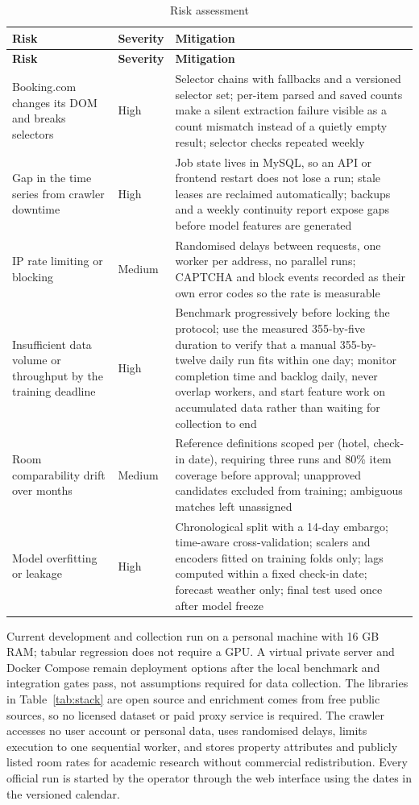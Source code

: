 \begin{longtable}{|p{3.5cm}|p{1.5cm}|p{8.2cm}|}
\caption{Risk assessment}
\label{tab:risks} \\
\hline
\textbf{Risk} & \textbf{Severity} & \textbf{Mitigation} \\
\hline
\endfirsthead
\hline
\textbf{Risk} & \textbf{Severity} & \textbf{Mitigation} \\
\hline
\endhead
\hline
\endfoot
\hline
\endlastfoot
Booking.com changes its DOM and breaks selectors & High & Selector chains with fallbacks and a versioned selector set; per-item parsed and saved counts make a silent extraction failure visible as a count mismatch instead of a quietly empty result; selector checks repeated weekly \\
\hline
Gap in the time series from crawler downtime & High & Job state lives in MySQL, so an API or frontend restart does not lose a run; stale leases are reclaimed automatically; backups and a weekly continuity report expose gaps before model features are generated \\
\hline
IP rate limiting or blocking & Medium & Randomised delays between requests, one worker per address, no parallel runs; CAPTCHA and block events recorded as their own error codes so the rate is measurable \\
\hline
Insufficient data volume or throughput by the training deadline & High & Benchmark progressively before locking the protocol; use the measured 355-by-five duration to verify that a manual 355-by-twelve daily run fits within one day; monitor completion time and backlog daily, never overlap workers, and start feature work on accumulated data rather than waiting for collection to end \\
\hline
Room comparability drift over months & Medium & Reference definitions scoped per (hotel, check-in date), requiring three runs and 80\% item coverage before approval; unapproved candidates excluded from training; ambiguous matches left unassigned \\
\hline
Model overfitting or leakage & High & Chronological split with a 14-day embargo; time-aware cross-validation; scalers and encoders fitted on training folds only; lags computed within a fixed check-in date; forecast weather only; final test used once after model freeze \\
\hline
\end{longtable}

Current development and collection run on a personal machine with 16 GB RAM; tabular regression does not require a GPU. A virtual private server and Docker Compose remain deployment options after the local benchmark and integration gates pass, not assumptions required for data collection. The libraries in Table~\ref{tab:stack} are open source and enrichment comes from free public sources, so no licensed dataset or paid proxy service is required. The crawler accesses no user account or personal data, uses randomised delays, limits execution to one sequential worker, and stores property attributes and publicly listed room rates for academic research without commercial redistribution. Every official run is started by the operator through the web interface using the dates in the versioned calendar.

\clearpage
